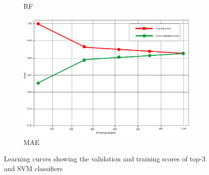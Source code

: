 \begin{figure}
\begin{subfigure}{0.48\linewidth}
		\caption{RF}
		\label{fig9c}
	\end{subfigure}
	\begin{subfigure}{0.48\linewidth}
		\centering
		\includegraphics[width=0.9\linewidth]{images/MAE.png}
		\caption{MAE}
		\label{fig9d}
	\end{subfigure}
	\caption{Learning curves showing the validation and training scores of top-3 and SVM classifiers} 
	\label{fig:lc}
\end{figure}

